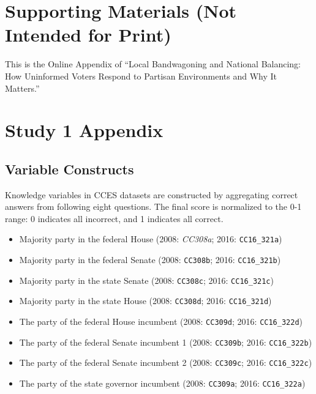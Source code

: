 \clearpage
\appendix

\section*{Supporting Materials (Not Intended for Print)}

\par This is the Online Appendix of ``Local Bandwagoning and National Balancing: How Uninformed Voters Respond to Partisan Environments and Why It Matters.'' 

\section{Study 1 Appendix} \label{appA}
\setcounter{table}{0}
\renewcommand{\thetable}{A\arabic{table}}
\setcounter{figure}{0}
\renewcommand{\thefigure}{A\arabic{figure}}

\subsection{Variable Constructs} 

\par Knowledge variables in CCES datasets are constructed by aggregating correct answers from following eight questions. The final score is normalized to the 0-1 range: 0 indicates all incorrect, and 1 indicates all correct.

\begin{itemize}
    \item Majority party in the federal House (2008: \textit{CC308a}; 2016: \texttt{CC16\_321a})
    \item Majority party in the federal Senate (2008: \texttt{CC308b}; 2016: \texttt{CC16\_321b})
    \item Majority party in the state Senate (2008: \texttt{CC308c}; 2016: \texttt{CC16\_321c})
    \item Majority party in the state House (2008: \texttt{CC308d}; 2016: \texttt{CC16\_321d})
    \item The party of the federal House incumbent (2008: \texttt{CC309d}; 2016: \texttt{CC16\_322d})
    \item The party of the federal Senate incumbent 1 (2008: \texttt{CC309b}; 2016: \texttt{CC16\_322b})
    \item The party of the federal Senate incumbent 2 (2008: \texttt{CC309c}; 2016: \texttt{CC16\_322c})
    \item The party of the state governor incumbent (2008: \texttt{CC309a}; 2016: \texttt{CC16\_322a})
\end{itemize}

